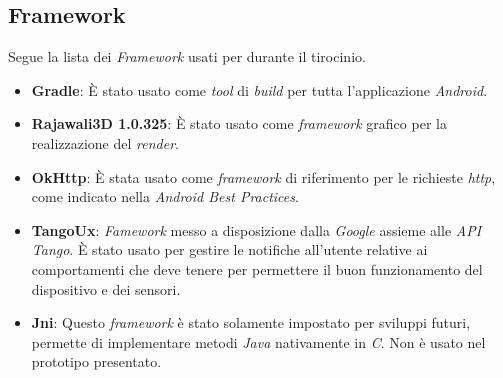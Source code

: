 \subsection{Framework}
Segue la lista dei \emph{Framework} usati per durante il tirocinio.
\begin{itemize}
	\item \textbf{Gradle}: È stato usato come \emph{tool} di \emph{build} per tutta l'applicazione \emph{Android}.
	\item \textbf{Rajawali3D 1.0.325}: È stato usato come \emph{framework} grafico per la realizzazione del \emph{render}.
	\item \textbf{OkHttp}: È stata usato come \emph{framework} di riferimento per le richieste \emph{http}, come indicato nella \emph{Android Best Practices}.
	\item \textbf{TangoUx}: \emph{Famework} messo a disposizione dalla \emph{Google} assieme alle \emph{API Tango}. È stato usato per gestire le notifiche all'utente relative ai comportamenti che deve tenere per permettere il buon funzionamento del dispositivo e dei sensori.
	\item \textbf{Jni}: Questo \emph{framework} è stato solamente impostato per sviluppi futuri, permette di implementare metodi \emph{Java} nativamente in \emph{C}. Non è usato nel prototipo presentato.
\end{itemize}












